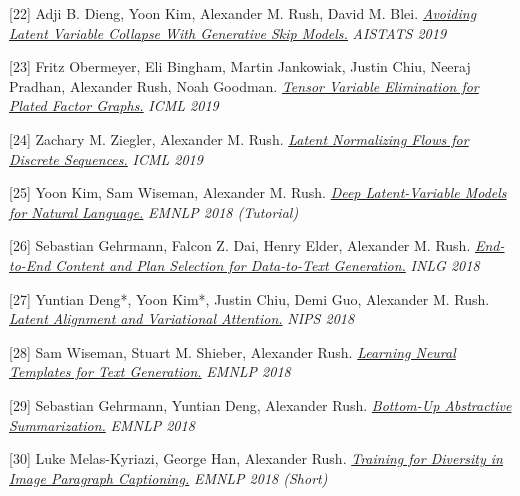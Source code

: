 \documentclass[10pt]{article}
\begin{document}
\medskip


[22] \ind Adji B. Dieng, Yoon Kim, Alexander M. Rush, David M. Blei. \emph{\href{ https://arxiv.org/pdf/1807.04863.pdf }{ Avoiding Latent Variable Collapse With Generative Skip Models.} }\emph{ AISTATS 2019 }

\medskip


[23] \ind Fritz Obermeyer, Eli Bingham, Martin Jankowiak, Justin Chiu, Neeraj Pradhan, Alexander Rush, Noah Goodman. \emph{\href{ https://arxiv.org/pdf/1902.03210.pdf }{ Tensor Variable Elimination for Plated Factor Graphs.} }\emph{ ICML 2019 }

\medskip


[24] \ind Zachary M. Ziegler, Alexander M. Rush. \emph{\href{ https://arxiv.org/pdf/1901.10548 }{ Latent Normalizing Flows for Discrete Sequences.} }\emph{ ICML 2019 }

\medskip


[25] \ind Yoon Kim, Sam Wiseman, Alexander M. Rush. \emph{\href{ https://github.com/harvardnlp/DeepLatentNLP/raw/master/tutorial_deep_latent.pdf }{ Deep Latent-Variable Models for Natural Language.} }\emph{ EMNLP 2018 (Tutorial) }

\medskip


[26] \ind Sebastian Gehrmann, Falcon Z. Dai, Henry Elder, Alexander M. Rush. \emph{\href{ https://arxiv.org/pdf/1810.04700 }{ End-to-End Content and Plan Selection for Data-to-Text Generation.} }\emph{ INLG 2018 }

\medskip


[27] \ind Yuntian Deng*, Yoon Kim*, Justin Chiu, Demi Guo, Alexander M. Rush. \emph{\href{ https://arxiv.org/pdf/1807.03756.pdf }{ Latent Alignment and Variational Attention.} }\emph{ NIPS 2018 }

\medskip


[28] \ind Sam Wiseman, Stuart M. Shieber, Alexander Rush. \emph{\href{ https://arxiv.org/abs/1808.10122 }{ Learning Neural Templates for Text Generation.} }\emph{ EMNLP 2018 }

\medskip


[29] \ind Sebastian Gehrmann, Yuntian Deng, Alexander Rush. \emph{\href{ https://arxiv.org/abs/1808.10792 }{ Bottom-Up Abstractive Summarization.} }\emph{ EMNLP 2018 }

\medskip


[30] \ind Luke Melas-Kyriazi, George Han, Alexander Rush. \emph{\href{ https://www.aclweb.org/anthology/D18-1084 }{ Training for Diversity in Image Paragraph Captioning.} }\emph{ EMNLP 2018 (Short) }
\end{document}
